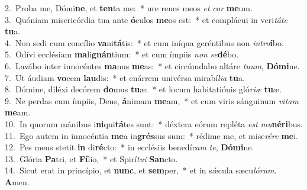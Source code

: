 {2.~}Proba me, Dómi\textbf{ne}, et \textbf{ten}ta me:~* ure renes meos \textit{et} \textit{cor} \textbf{me}um.\\
{3.~}Quóniam misericórdia tua ante \textbf{ó}culos \textbf{me}os est:~* et complácui in veri\textit{tá}\textit{te} \textbf{tu}a.\\
{4.~}Non sedi cum concílio \textbf{va}ni\textbf{tá}tis:~* et cum iníqua geréntibus non \textit{in}\textit{tro}\textbf{í}bo.\\
{5.~}Odívi ecclésiam \textbf{ma}li\textbf{gnán}tium:~* et cum ímpiis \textit{non} \textit{se}\textbf{dé}bo.\\
{6.~}Lavábo inter innocéntes \textbf{ma}nus \textbf{me}as:~* et circúmdabo altáre \textit{tu}\textit{um}, \textbf{Dó}\textbf{mi}ne.\\
{7.~}Ut áudiam \textbf{vo}cem \textbf{lau}dis:~* et enárrem univérsa mirabí\textit{li}\textit{a} \textbf{tu}a.\\
{8.~}Dómine, diléxi decórem \textbf{do}mus \textbf{tu}æ:~* et locum habitatiónis gló\textit{ri}\textit{æ} \textbf{tu}æ.\\
{9.~}Ne perdas cum ímpiis, Deus, \textbf{á}nimam \textbf{me}am,~* et cum viris sánguinum \textit{vi}\textit{tam} \textbf{me}am.\\
{10.~}In quorum mánibus i\textbf{ni}qui\textbf{tá}tes sunt:~* déxtera eórum repléta \textit{est} \textit{mu}\textbf{né}\textbf{ri}bus.\\
{11.~}Ego autem in innocéntia \textbf{me}a in\textbf{grés}sus sum:~* rédime me, et mise\textit{ré}\textit{re} \textbf{me}i.\\
{12.~}Pes meus stetit \textbf{in} di\textbf{ré}cto:~* in ecclésiis benedí\textit{cam} \textit{te}, \textbf{Dó}\textbf{mi}ne.\\
{13.~}Glória \textbf{Pa}tri, et \textbf{Fí}lio,~* et Spirí\textit{tu}\textit{i} \textbf{San}cto.\\
{14.~}Sicut erat in princípio, et \textbf{nunc}, et \textbf{sem}per,~* et in sǽcula sæcu\textit{ló}\textit{rum}. \textbf{A}men.\\
